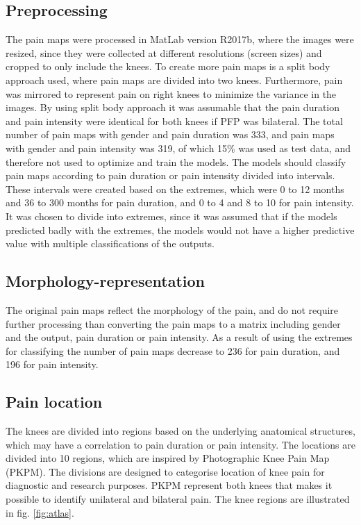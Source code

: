 \subsection*{\textbf{Preprocessing}}
\noindent
The pain maps were processed in MatLab version R2017b, where the images were resized, since they were collected at different resolutions (screen sizes) and cropped to only include the knees. To create more pain maps is a split body approach used, where pain maps are divided into two knees. Furthermore, pain was mirrored to represent pain on right knees to minimize the variance in the images. By using split body approach it was assumable that the pain duration and pain intensity were identical for both knees if PFP was bilateral. The total number of pain maps with gender and pain duration was 333, and pain maps with gender and pain intensity was 319, of which 15\% was used as test data, and therefore not used to optimize and train the models. \newline
\noindent
The models should classify pain maps according to pain duration or pain intensity divided into intervals. These intervals were created based on the extremes, which were 0 to 12 months and 36 to 300 months for pain duration, and 0 to 4 and 8 to 10 for pain intensity. It was chosen to divide into extremes, since it was assumed that
if the models predicted badly with the extremes, the models would not have a higher predictive value with multiple classifications of the outputs.

\subsection*{\textbf{Morphology-representation}}
\noindent
The original pain maps reflect the morphology of the pain, and do not require further processing than converting the pain maps to a matrix including gender and the output, pain duration or pain intensity. As a result of using the extremes for classifying the number of pain maps decrease to 236 for pain duration, and 196 for pain intensity.


\subsection*{\textbf{Pain location}} 
\noindent
The knees are divided into regions based on the underlying anatomical structures, which may have a correlation to pain duration or pain intensity.
The locations are divided into 10 regions, which are inspired by Photographic Knee Pain Map (PKPM). The divisions are designed to categorise location of knee pain for diagnostic and research purposes. PKPM represent both knees that makes it possible to identify unilateral and bilateral pain.\citep{Elson2010} The knee regions are illustrated in fig. \ref{fig:atlas}.

